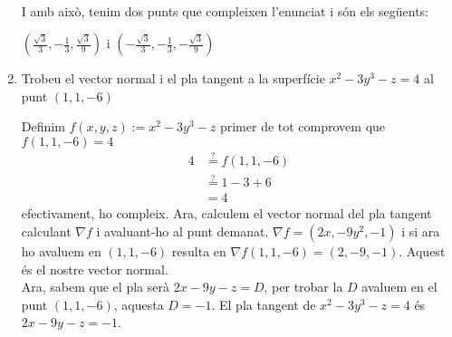 \documentclass[a4paper, 12pt]{article}
\begin{document}
\begin{exercici}
\begin{enumerate}[label=\alph*)]
\begin{solucio}
\begin{displaymath}
\begin{split}
                    \end{split}
                \end{displaymath}
                I amb això, tenim dos punts que compleixen l'enunciat i són els següents:
                \begin{center}
                    $\left(\frac{\sqrt{3}}{3}, -\frac{1}{3}, \frac{\sqrt{3}}{9}\right)$ i $\left(-\frac{\sqrt{3}}{3}, -\frac{1}{3}, -\frac{\sqrt{3}}{9}\right)$                    
                \end{center}
            \end{solucio}
            \item Trobeu el vector normal i el pla tangent a la superfície $x^2 -3y^3 - z = 4$ al punt $\left(1,1,-6\right)$\\
            \begin{solucio}
                Definim $f(x,y,z) := x^2 - 3y^3-z$ primer de tot comprovem que $f(1, 1, -6) = 4$
                \begin{displaymath}
                    \begin{split}
                        4 &\stackrel{?}{=} f(1, 1, -6)\\
                        &\stackrel{?}{=} 1-3+6\\
                        &= 4
                    \end{split}
                \end{displaymath}
                efectivament, ho compleix. Ara, calculem el vector normal del pla tangent calculant $\nabla f$
                i avaluant-ho al punt demanat. $\nabla f = \left(2x, -9y^2, -1\right)$ i si ara ho
                avaluem en $\left(1,1,-6\right)$ resulta en $\nabla f \left(1,1,-6\right) = \left(2, -9, -1\right)$.
                Aquest és el nostre vector normal.\\
                Ara, sabem que el pla serà $2x-9y-z = D$, per trobar la $D$ avaluem en el punt $\left(1,1,-6\right)$,
                aquesta $D = -1$. El pla tangent de $x^2-3y^3-z = 4$ és $2x-9y-z = -1$.
            \end{solucio}
        \end{enumerate}
    \end{exercici}
\end{document}
